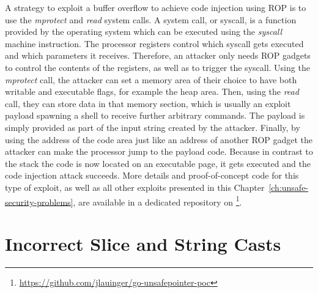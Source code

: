 A strategy to exploit a buffer overflow to achieve code injection using \acrshort{ROP} is to use the \textit{mprotect}
and \textit{read} system calls.
A system call, or syscall, is a function provided by the operating system which can be executed using the
\textit{syscall} machine instruction.
The processor registers control which syscall gets executed and which parameters it receives.
Therefore, an attacker only needs \acrshort{ROP} gadgets to control the contents of the registers, as well as to trigger
the syscall.
Using the \textit{mprotect} call, the attacker can set a memory area of their choice to have both writable and
executable flags, for example the heap area.
Then, using the \textit{read} call, they can store data in that memory section, which is usually an exploit payload
spawning a shell to receive further arbitrary commands.
The payload is simply provided as part of the input string created by the attacker.
Finally, by using the address of the code area just like an address of another \acrshort{ROP} gadget the attacker can
make the processor jump to the payload code.
Because in contrast to the stack the code is now located on an executable page, it gets executed and the code injection
attack succeeds.
More details and proof-of-concept code for this type of exploit, as well as all other exploits presented in this
Chapter~\ref{ch:unsafe-security-problems}, are available in a dedicated repository on
\github{}\footnote{\url{https://github.com/jlauinger/go-unsafepointer-poc}}.



\section{Incorrect Slice and String Casts}\label{sec:unsafe-security-problems:slice-casts}

